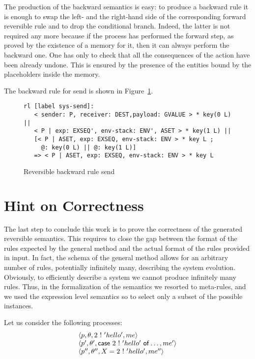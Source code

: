 \documentclass{article}[12pt,a4paper]
\theoremstyle{definition}
\begin{document}
The production of the backward semantics is easy: to produce a
backward rule it is enough to swap the left- and the right-hand side
of the corresponding forward reversible rule and to drop the
conditional branch.  Indeed, the latter is not required any more
because if the process has performed the forward step, as proved by
the existence of a memory for it, then it can always perform the
backward one. One has only to check that all the consequences of the
action have been already undone. This is ensured by the presence of
the entities bound by the placeholders inside the memory.

The backward rule for send is shown in Figure~\ref{fig:revsend}.

\begin{figure}[t]
  \centering
\begin{verbatim}
rl [label sys-send]:
   < sender: P, receiver: DEST,payload: GVALUE > * key(0 L) || 
   < P | exp: EXSEQ', env-stack: ENV', ASET > * key(1 L) || 
   [< P | ASET, exp: EXSEQ, env-stack: ENV > * key L ;
     @: key(0 L) || @: key(1 L)]
   => < P | ASET, exp: EXSEQ, env-stack: ENV > * key L 
\end{verbatim}
  
  \caption{Reversible backward rule send}
  \label{fig:revsend}
\end{figure}

\section{Hint on Correctness}\label{sec:ongoing-work}

The last step to conclude this work is to prove the correctness of the
generated reversible semantics. This requires to close the gap between
the format of the rules expected by the general method and the actual
format of the rules provided in input. In fact, the schema of the
general method allows for an arbitrary number of rules, potentially
infinitely many, describing the system evolution. Obviously, to
efficiently describe a system we cannot produce infinitely many rules.
Thus, in the formalization of the semantics we resorted to meta-rules,
and we used the expression level semantics so to select only a subset
of the possible instances.

Let us consider the following processes:
\[
  \begin{array}{l}
    \langle p, \theta, 2~\mathsf{!}~'hello', me\rangle\\
    \langle p', \theta', \mathsf{case}~2~\mathsf{!}~'hello'~\mathsf{of} \ldots, me'\rangle\\
    \langle p'', \theta'', X = 2~\mathsf{!}~'hello', me''\rangle 
  \end{array}
\]
\end{document}
